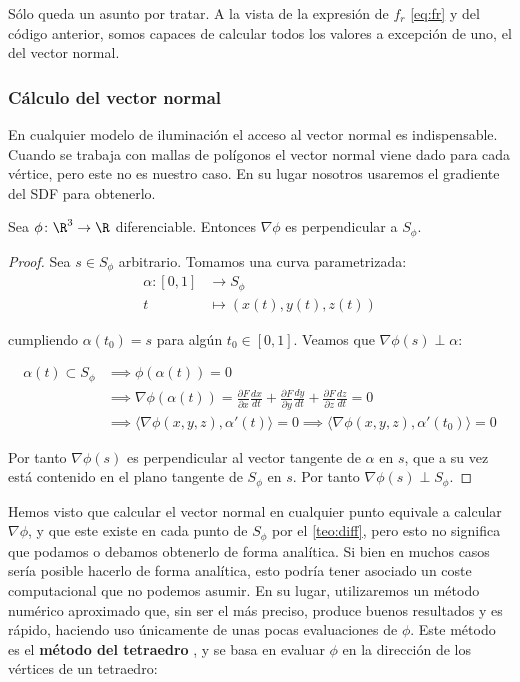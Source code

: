 Sólo queda un asunto por tratar. A la vista de la expresión de $f_r$ \eqref{eq:fr} y del código anterior, somos capaces de calcular todos los valores a excepción de uno, el del vector normal. 

\subsubsection{Cálculo del vector normal}
En cualquier modelo de iluminación el acceso al vector normal es indispensable. Cuando se trabaja con mallas de polígonos el vector normal viene dado para cada vértice, pero este no es nuestro caso. En su lugar nosotros usaremos el gradiente del SDF para obtenerlo.
\begin{proposicion}\label{p:gradient_perp}
  Sea $\phi\colon \R^3\to \R$ diferenciable. Entonces $\nabla\phi$ es perpendicular a $S_\phi$.
\end{proposicion}
\begin{proof}
  Sea $s\in S_\phi$ arbitrario. Tomamos una curva parametrizada:
  \begin{align*}
    \alpha \colon [0,1] & \to S_\phi                             \\
    t                   & \mapsto \left(x(t), y(t), z(t) \right)
  \end{align*}

  cumpliendo $\alpha(t_0)=s$ para algún $t_0\in [0,1]$. Veamos que $\nabla\phi(s) \perp \alpha$:

  \begin{align*}
    \alpha(t)\subset S_\phi & \implies \phi(\alpha(t))=0\\
                            & \implies \nabla\phi(\alpha(t)) = \frac{\partial{F}}{\partial{x}}\frac{dx}{dt} + \frac{\partial{F}}{\partial{y}}\frac{dy}{dt} + \frac{\partial{F}}{\partial{z}}\frac{dz}{dt} = 0 \\
                            & \implies \langle \nabla\phi(x,y,z), \alpha'(t)\rangle = 0 \implies \langle \nabla\phi(x,y,z), \alpha'(t_0)\rangle = 0
  \end{align*}

    Por tanto $\nabla\phi(s)$ es perpendicular al vector tangente de $\alpha$ en $s$, que a su vez está contenido en el plano tangente de $S_\phi$ en $s$. Por tanto $\nabla\phi(s) \perp S_\phi$.
\end{proof}

Hemos visto que calcular el vector normal en cualquier punto equivale a calcular $\nabla\phi$, y que este existe en cada punto de $S_{\phi}$ por el \autoref{teo:diff}, pero esto no significa que podamos o debamos obtenerlo de forma analítica. Si bien en muchos casos sería posible hacerlo de forma analítica, esto podría tener asociado un coste computacional que no podemos asumir. En su lugar, utilizaremos un método numérico aproximado que, sin ser el más preciso, produce buenos resultados y es rápido, haciendo uso únicamente de unas pocas evaluaciones de $\phi$. Este método es el \textbf{método del tetraedro} \cite{article:tetra}, y se basa en evaluar $\phi$ en la dirección de los vértices de un tetraedro:

